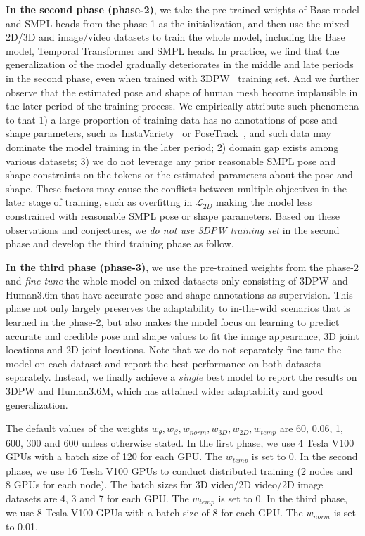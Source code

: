 \textbf{In the second phase (phase-2)}, we take the pre-trained weights of Base model and SMPL heads from the phase-1 as the initialization, and then use the mixed 2D/3D and image/video datasets to train the whole model, including the Base model, Temporal Transformer and SMPL heads. In practice, we find that the generalization of the model gradually deteriorates in the middle and late periods in the second phase, even when trained with 3DPW~\citep{3dpw:von2018recovering} training set.
And we further observe that the estimated pose and shape of human mesh become implausible in the later period of the training process. 
We empirically attribute such phenomena to that 1) a large proportion of training data has no annotations of pose and shape parameters, such as InstaVariety~\citep{insta:kanazawa2019learning} or PoseTrack~\citep{posetrack:andriluka2018posetrack}, and such data may dominate the model training in the later period; 2) domain gap exists among various datasets; 3) we do not leverage any prior reasonable SMPL pose and shape constraints on the tokens or the estimated parameters about the pose and shape. These factors may cause the conflicts between multiple objectives in the later stage of training, such as overfittng in $\mathcal{L}_{2D}$ making the model less constrained with reasonable SMPL pose or shape parameters.
Based on these observations and conjectures, we \textit{do not use 3DPW training set} in the second phase and develop the third training phase as follow. 

\textbf{In the third phase (phase-3)}, we use the pre-trained weights from the phase-2 and \textit{fine-tune} the whole model on mixed datasets only consisting of 3DPW and Human3.6m that have accurate pose and shape annotations as supervision.
This phase not only largely preserves the adaptability to in-the-wild scenarios that is learned in the phase-2, but also makes the model focus on learning to predict accurate and credible pose and shape values to fit the image appearance, 3D joint locations and 2D joint locations. 
Note that we do not separately fine-tune the model on each dataset and report the best performance on both datasets separately. 
Instead, we finally achieve a \textit{single} best model to report the results on 3DPW and Human3.6M, which has attained wider adaptability and good generalization.


The default values of the weights $w_{\theta}, w_{\beta}, w_{norm}, w_{3D}, w_{2D}, w_{temp}$ are 60, 0.06, 1, 600, 300 and 600 unless otherwise stated.
In the first phase, we use 4 Tesla V100 GPUs with a batch size of 120 for each GPU.  The $w_{temp}$ is set to 0.
In the second phase, we use 16 Tesla V100 GPUs to conduct distributed training (2 nodes and 8 GPUs for each node). The batch sizes for 3D video/2D video/2D image datasets are 4, 3 and 7 for each GPU. The $w_{temp}$ is set to 0.
In the third phase, we use 8 Tesla V100 GPUs with a batch size of 8 for each GPU. The $w_{norm}$ is set to 0.01.

